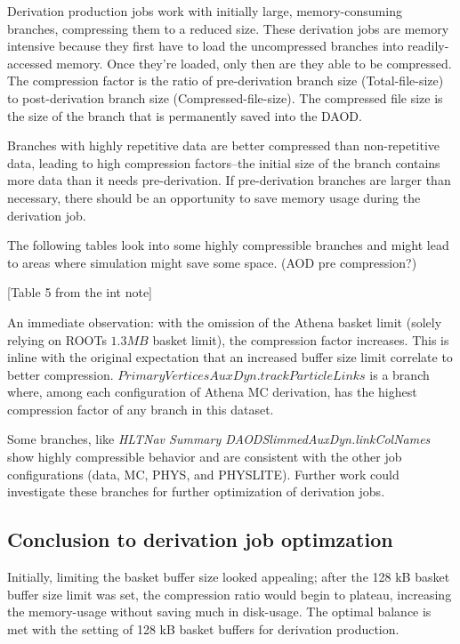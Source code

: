 Derivation production jobs work with initially large, memory-consuming branches, compressing them to a reduced size. 
These derivation jobs are memory intensive because they first have to load the uncompressed branches into readily-accessed memory. 
Once they're loaded, only then are they able to be compressed. 
The compression factor is the ratio of pre-derivation branch size (Total-file-size) to post-derivation branch size (Compressed-file-size). 
The compressed file size is the size of the branch that is permanently saved into the DAOD.  

Branches with highly repetitive data are better compressed than non-repetitive data, leading to high compression factors--the initial size of the branch contains more data than it needs pre-derivation. 
If pre-derivation branches are larger than necessary, there should be an opportunity to save memory usage during the derivation job. 

The following tables look into some highly compressible branches and might lead to areas where simulation might save some space. (AOD pre compression?)

[Table 5 from the int note]

An immediate observation: with the omission of the Athena basket limit (solely relying on ROOTs $1.3 MB$ basket limit), the compression factor increases. 
This is inline with the original expectation that an increased buffer size limit correlate to better compression. 
$\textit{PrimaryVerticesAuxDyn.trackParticleLinks}$ is a branch where, among each configuration of Athena MC derivation, has the highest compression factor of any branch in this dataset. 

Some branches, like \textit{HLTNav Summary DAODSlimmedAuxDyn.linkColNames} show highly compressible behavior and are consistent with the other job configurations (data, MC, PHYS, and PHYSLITE). 
Further work could investigate these branches for further optimization of derivation jobs.

\subsection{Conclusion to derivation job optimzation}

Initially, limiting the basket buffer size looked appealing; after the 128 kB basket buffer size limit was set, the compression ratio would begin to plateau, increasing the memory-usage without saving much in disk-usage. 
The optimal balance is met with the setting of 128 kB basket buffers for derivation production. 

